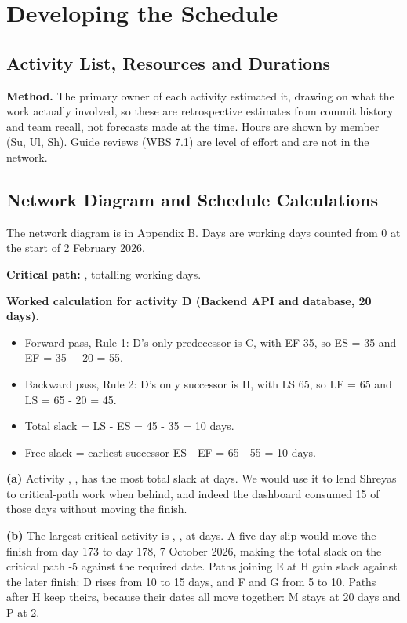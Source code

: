 \section{Developing the Schedule}
\subsection{Activity List, Resources and Durations}
\textbf{Method.} The primary owner of each activity estimated it, drawing on what the work actually involved, so these are retrospective estimates from commit history and team recall, not forecasts made at the time. Hours are shown by member (Su, Ul, Sh). Guide reviews (WBS 7.1) are level of effort and are not in the network.



\subsection{Network Diagram and Schedule Calculations}
The network diagram is in Appendix B. Days are working days counted from 0 at the start of 2 February 2026.



\textbf{Critical path:} \vCriticalPath{}, totalling \vProjectDur{} working days.

\textbf{Worked calculation for activity D (Backend API and database, 20 days).}
\begin{itemize}
\item Forward pass, Rule 1: D's only predecessor is C, with EF 35, so ES = 35 and EF = 35 + 20 = 55.
\item Backward pass, Rule 2: D's only successor is H, with LS 65, so LF = 65 and LS = 65 - 20 = 45.
\item Total slack = LS - ES = 45 - 35 = 10 days.
\item Free slack = earliest successor ES - EF = 65 - 55 = 10 days.
\end{itemize}

\textbf{(a)} Activity \vSlackMostId{}, \vSlackMostName{}, has the most total slack at \vSlackMost{} days. We would use it to lend Shreyas to critical-path work when behind, and indeed the dashboard consumed 15 of those days without moving the finish.

\textbf{(b)} The largest critical activity is \vLongestId{}, \vLongestName{}, at \vLongestDur{} days. A five-day slip would move the finish from day 173 to day 178, 7 October 2026, making the total slack on the critical path -5 against the required date. Paths joining E at H gain slack against the later finish: D rises from 10 to 15 days, and F and G from 5 to 10. Paths after H keep theirs, because their dates all move together: M stays at 20 days and P at 2.

